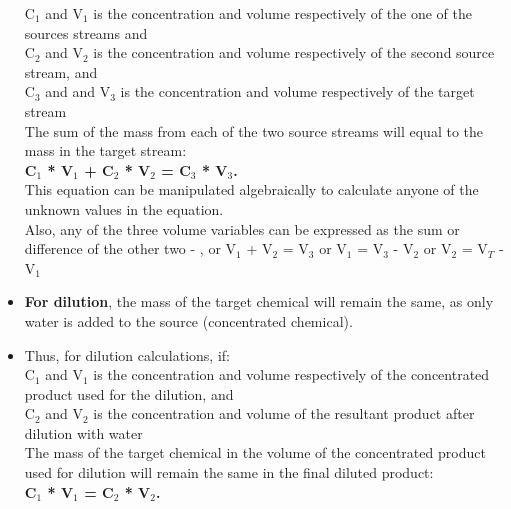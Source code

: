 \begin{itemize}
C$_1$ and V$_1$ is the concentration and volume respectively of the one of the sources streams and\\
\vspace{0.2cm}
 C$_2$ and V$_2$ is the concentration and volume respectively of the second source stream, and \\
 \vspace{0.2cm}
C$_3$ and and V$_3$ is the concentration and volume respectively of the target stream\\
\vspace{0.3cm}
The sum of the mass from each of the two source streams will equal to the mass in the target stream:\\
\vspace{0.3cm}
\textbf{C$_1$ * V$_1$ + C$_2$ * V$_2$ =  C$_3$ * V$_3$.}\\
\vspace{0.3cm}
This equation can be manipulated algebraically to calculate anyone of the unknown values in the equation.\\
\vspace{0.2cm}
Also, any of the three volume variables can be expressed as the sum or difference of the other two - , or V$_1$ + V$_2$ = V$_3$ or V$_1$ = V$_3$ - V$_2$ or V$_2$ = V$_T$ - V$_1$\\

\item \textbf{For dilution}, the mass of the target chemical will remain the same, as only water is added to the source (concentrated chemical).
\item Thus, for dilution calculations, if:\\
\vspace{0.2cm}
C$_1$ and V$_1$ is the concentration and volume respectively of the concentrated product used for the dilution, and\\
\vspace{0.2cm}
C$_2$ and V$_2$ is the concentration and volume of the resultant product after dilution with water\\
\vspace{0.2cm}
The mass of the target chemical in the volume of the concentrated product used for dilution will remain the same in the final diluted product:\\
\vspace{0.3cm}
\textbf{C$_1$ * V$_1$ =  C$_2$ * V$_2$.}\\

\end{itemize}

